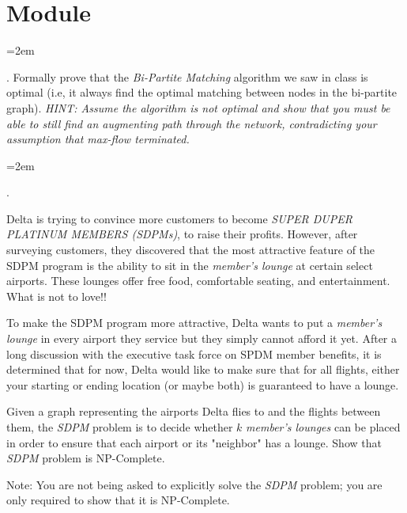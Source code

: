 \documentclass[12pt]{article}
\def\homework{Module}
\newcounter{quesnum}
\newcommand{\question}[2][??]{
\begin{list}{\labelitemi}{\leftmargin=2em}
\item [\arabic{quesnum}.] {#2}
\end{list}
\addtocounter{quesnum}{1}
}
\begin{document}
\section*{\homework}




\question[1]{
Formally prove that the \emph{Bi-Partite Matching} algorithm we saw in class is optimal (i.e, it always find the optimal matching between nodes in the bi-partite graph). \emph{HINT: Assume the algorithm is not optimal and show that you must be able to still find an augmenting path through the network, contradicting your assumption that max-flow terminated.}
}





\question[3]{
Delta is trying to convince more customers to become \emph{SUPER DUPER PLATINUM MEMBERS (SDPMs)}, to raise their profits. However, after surveying customers, they discovered that the most attractive feature of the SDPM program is the ability to sit in the \emph{member's lounge} at certain select airports. These lounges offer free food, comfortable seating, and entertainment. What is not to love!!

To make the SDPM program more attractive, Delta wants to put a \emph{member's lounge} in every airport they service but they simply cannot afford it yet. After a long discussion with the executive task force on SPDM member benefits, it is determined that for now, Delta would like to make sure that for all flights, either your starting or ending location (or maybe both) is guaranteed to have a lounge.

Given a graph representing the airports Delta flies to and the flights between them, the \emph{SDPM} problem is to decide whether $k$ \emph{member's lounges} can be placed in order to ensure that each airport or its "neighbor" has a lounge. Show that \emph{SDPM} problem is NP-Complete.

Note: You are not being asked to explicitly solve the \emph{SDPM} problem; you are only required to show that it is NP-Complete.
}

\end{document}
